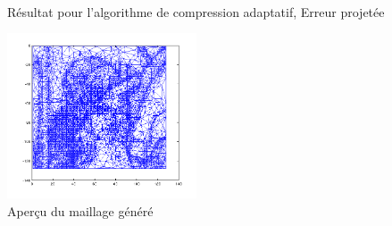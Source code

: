 \documentclass{report}
\begin{document}
\begin{figure}[ht!]
\begin{center}
{        }\\ %
    \end{center}
    \caption{%
        Résultat pour l'algorithme de compression adaptatif, Erreur projetée
    }%
   \label{fig:subfigures}
\end{figure}

\clearpage

\begin{figure}[ht]
\centering
\includegraphics[width=0.5\textwidth]{lenaDelauMesh.png}
\caption{Aperçu du maillage généré}
\end{figure}
\end{document}
